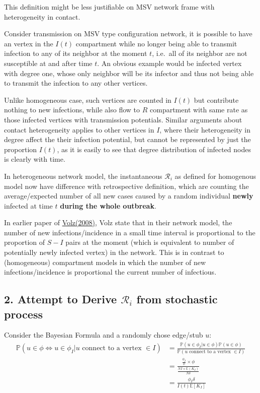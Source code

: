 \documentclass[
]{article}
\begin{document}
This definition might be less justifiable on MSV network frame with
heterogeneity in contact.

Consider transmission on MSV type configuration network, it is possible
to have an vertex in the \(I(t)\) compartment while no longer being able
to transmit infection to any of its neighbor at the moment \(t\),
i.e.~all of its neighbor are not susceptible at and after time \(t\). An
obvious example would be infected vertex with degree one, whose only
neighbor will be its infector and thus not being able to transmit the
infection to any other vertices.

Unlike homogeneous case, such vertices are counted in \(I(t)\) but
contribute nothing to new infections, while also flow to \(R\)
compartment with same rate as those infected vertices with transmission
potentials. Similar arguments about contact heterogeneity applies to
other vertices in \(I\), where their heterogeneity in degree affect the
their infection potential, but cannot be represented by just the
proportion \(I(t)\), as it is easily to see that degree distribution of
infected nodes is clearly with time.

In heterogeneous network model, the instantaneous \(\mathcal{R}_{i}\) as
defined for homogenous model now have difference with retrospective
definition, which are counting the average/expected number of all new
cases caused by a random individual \textbf{newly} infected at time
\(t\) \textbf{during the whole outbreak}.

In earlier paper of
\href{https://doi.org/10.1007/s00285-007-0116-4}{Volz(2008)}, Volz state
that in their network model, the number of new infections/incidence in a
small time interval is proportional to the proportion of \(S-I\) pairs
at the moment (which is equivalent to number of potentially newly
infected vertex) in the network. This is in contrast to (homogeneous)
compartment models in which the number of new infections/incidence is
proportional the current number of infectious.

\subsection{\texorpdfstring{2. Attempt to Derive \(\mathcal{R}_{i}\)
from stochastic
process}{2. Attempt to Derive \textbackslash mathcal\{R\}\_\{i\} from stochastic process}}\label{attempt-to-derive-mathcalr_i-from-stochastic-process}

Consider the Bayesian Formula and a randomly chose edge/stub \(u\):
\[\begin{aligned}
\mathbb{P}(u\in\phi \Leftrightarrow u \in\phi_I|u \text{ connect to a vertex }\in I) & = \frac{\mathbb{P}(u\in\phi_I|u\in\phi)\mathbb{P}(u\in\phi)}{\mathbb{P}(u \text{ connect to a vertex }\in I)}
\\
& =\frac{\frac{\phi_I}{\phi}\times \phi}{\frac{NI\times \mathbb{E}(K_I)}{N\delta}}
\\
& =\frac{\phi_I \delta}{I(t) \mathbb{E}[K_I]}
\end{aligned}\]
\end{document}
